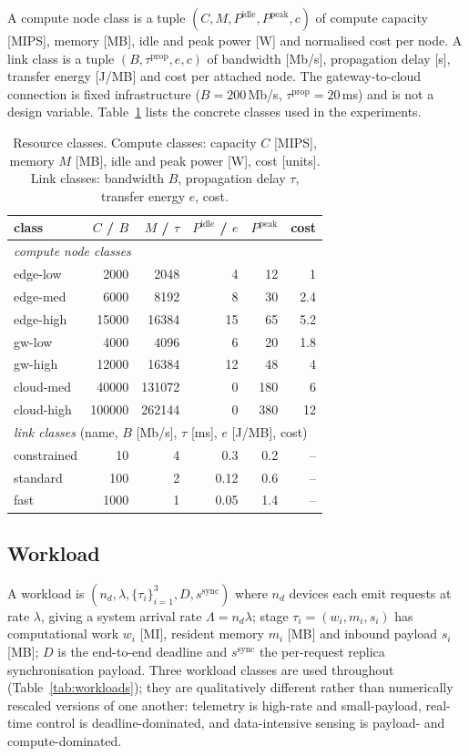 \documentclass[preprint,11pt,3p]{elsarticle}
\theoremstyle{plain}
\theoremstyle{definition}
\begin{document}
A compute node class is a tuple $(C, M, P^{\mathrm{idle}}, P^{\mathrm{peak}}, c)$ of
compute capacity [MIPS], memory [MB], idle and peak power [W] and normalised cost per
node. A link class is a tuple $(B, \tau^{\mathrm{prop}}, e, c)$ of bandwidth [Mb/s],
propagation delay [s], transfer energy [J/MB] and cost per attached node. The
gateway-to-cloud connection is fixed infrastructure ($B=200$\,Mb/s,
$\tau^{\mathrm{prop}}=20$\,ms) and is not a design variable. Table~\ref{tab:resources}
lists the concrete classes used in the experiments.

\begin{table}[t]
\centering
\caption{Resource classes. Compute classes: capacity $C$ [MIPS], memory $M$ [MB], idle
and peak power [W], cost [units]. Link classes: bandwidth $B$, propagation delay $\tau$,
transfer energy $e$, cost.}
\label{tab:resources}
\scriptsize
\begin{tabular}{lrrrrr}
\toprule
class & $C$ / $B$ & $M$ / $\tau$ & $P^{\mathrm{idle}}$ / $e$ & $P^{\mathrm{peak}}$ & cost \\
\midrule
\multicolumn{6}{l}{\emph{compute node classes}} \\
edge-low & 2000 & 2048 & 4 & 12 & 1 \\
edge-med & 6000 & 8192 & 8 & 30 & 2.4 \\
edge-high & 15000 & 16384 & 15 & 65 & 5.2 \\
gw-low & 4000 & 4096 & 6 & 20 & 1.8 \\
gw-high & 12000 & 16384 & 12 & 48 & 4 \\
cloud-med & 40000 & 131072 & 0 & 180 & 6 \\
cloud-high & 100000 & 262144 & 0 & 380 & 12 \\
\midrule \multicolumn{6}{l}{\emph{link classes} (name, $B$ [Mb/s], $\tau$ [ms], $e$ [J/MB], cost)} \\
constrained & 10 & 4 & 0.3 & 0.2 & -- \\
standard & 100 & 2 & 0.12 & 0.6 & -- \\
fast & 1000 & 1 & 0.05 & 1.4 & -- \\
\bottomrule
\end{tabular}
\end{table}

\subsection{Workload}
A workload is $(n_d, \lambda, \{\tau_i\}_{i=1}^{3}, D, s^{\mathrm{sync}})$ where $n_d$
devices each emit requests at rate $\lambda$, giving a system arrival rate
$\Lambda = n_d\lambda$; stage $\tau_i=(w_i, m_i, s_i)$ has computational work $w_i$ [MI],
resident memory $m_i$ [MB] and inbound payload $s_i$ [MB]; $D$ is the end-to-end deadline
and $s^{\mathrm{sync}}$ the per-request replica synchronisation payload. Three workload
classes are used throughout (Table~\ref{tab:workloads}); they are qualitatively
different rather than numerically rescaled versions of one another: telemetry is
high-rate and small-payload, real-time control is deadline-dominated, and data-intensive
sensing is payload- and compute-dominated.
\end{document}
